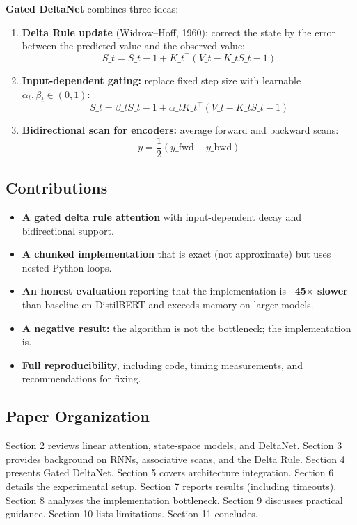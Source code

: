 \textbf{Gated DeltaNet} combines three ideas:

\begin{enumerate}
\item \textbf{Delta Rule update} (Widrow--Hoff, 1960): correct the state by the error
  between the predicted value and the observed value:
  $$
  S\_t = S\_{t-1} + K\_t^\top (V\_t - K\_t S\_{t-1})
  \tag{1.2}
  $$

\item \textbf{Input-dependent gating:} replace fixed step size with learnable
  $\alpha_t, \beta_t \in (0, 1)$:
  $$
  S\_t = \beta\_t S\_{t-1} + \alpha\_t K\_t^\top (V\_t - K\_t S\_{t-1})
  \tag{1.3}
  $$

\item \textbf{Bidirectional scan for encoders:} average forward and backward scans:
  $$
  y = \frac{1}{2}(y\_{\text{fwd}} + y\_{\text{bwd}})
  \tag{1.4}
  $$

\end{enumerate}
\subsection{Contributions}

\begin{itemize}
\item \textbf{A gated delta rule attention} with input-dependent decay and
  bidirectional support.
\item \textbf{A chunked implementation} that is exact (not approximate) but uses
  nested Python loops.
\item \textbf{An honest evaluation} reporting that the implementation is
  \textbf{~45$\times$ slower} than baseline on DistilBERT and exceeds memory on larger
  models.
\item \textbf{A negative result:} the algorithm is not the bottleneck; the
  implementation is.
\item \textbf{Full reproducibility}, including code, timing measurements, and
  recommendations for fixing.

\end{itemize}
\subsection{Paper Organization}

Section 2 reviews linear attention, state-space models, and DeltaNet. 
Section 3 provides background on RNNs, associative scans, and the Delta 
Rule. Section 4 presents Gated DeltaNet. Section 5 covers architecture 
integration. Section 6 details the experimental setup. Section 7 reports 
results (including timeouts). Section 8 analyzes the implementation 
bottleneck. Section 9 discusses practical guidance. Section 10 lists 
limitations. Section 11 concludes.



